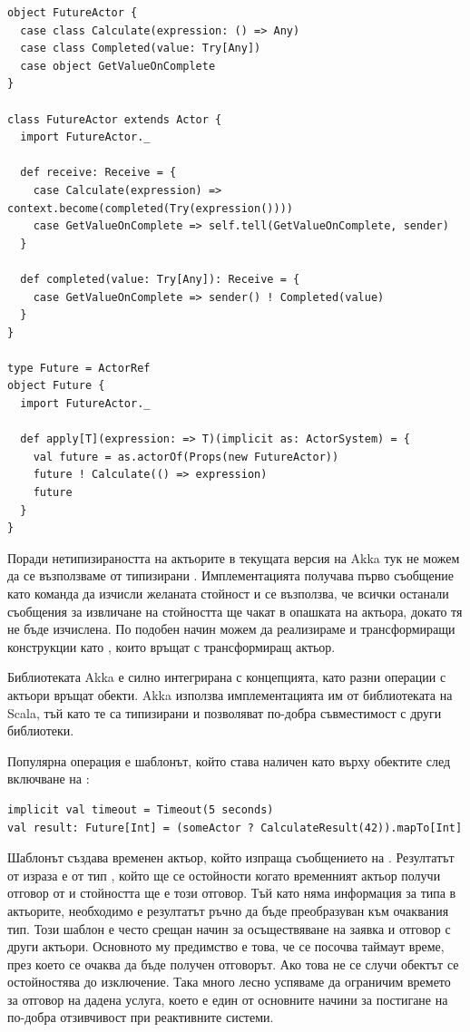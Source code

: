 \begin{lstlisting}
object FutureActor {
  case class Calculate(expression: () => Any)
  case class Completed(value: Try[Any])
  case object GetValueOnComplete
}

class FutureActor extends Actor {
  import FutureActor._
  
  def receive: Receive = {
    case Calculate(expression) => context.become(completed(Try(expression())))
    case GetValueOnComplete => self.tell(GetValueOnComplete, sender)
  }
  
  def completed(value: Try[Any]): Receive = {
    case GetValueOnComplete => sender() ! Completed(value)
  }
}

type Future = ActorRef
object Future {
  import FutureActor._
  
  def apply[T](expression: => T)(implicit as: ActorSystem) = {
    val future = as.actorOf(Props(new FutureActor))
    future ! Calculate(() => expression)
    future
  }
}
\end{lstlisting}

Поради нетипизираността на актьорите в текущата версия на Akka тук не можем да се възползваме от типизирани . Имплементацията получава първо съобщение като команда да изчисли желаната стойност и се възползва, че всички останали съобщения за извличане на стойността ще чакат в опашката на актьора, докато тя не бъде изчислена. По подобен начин можем да реализираме и трансформиращи конструкции като , които връщат  с трансформиращ актьор.

Библиотеката Akka е силно интегрирана с  концепцията, като разни операции с актьори връщат  обекти. Akka използва имплементацията им от библиотеката на Scala, тъй като те са типизирани и позволяват по-добра съвместимост с други библиотеки.

Популярна операция е  шаблонът, който става наличен като  върху  обектите след включване на :

\begin{lstlisting}
implicit val timeout = Timeout(5 seconds)
val result: Future[Int] = (someActor ? CalculateResult(42)).mapTo[Int]
\end{lstlisting}

Шаблонът създава временен актьор, който изпраща съобщението  на . Резултатът от израза е от тип , който ще се остойности когато временният актьор получи отговор от  и стойността ще е този отговор. Тъй като няма информация за типа в актьорите, необходимо е резултатът ръчно да бъде преобразуван към очаквания тип. Този шаблон е често срещан начин за осъществяване на заявка и отговор с други актьори. Основното му предимство е това, че се посочва таймаут време, през което се очаква да бъде получен отговорът. Ако това не се случи  обектът се остойностява до  изключение. Така много лесно успяваме да ограничим времето за отговор на дадена услуга, което е един от основните начини за постигане на по-добра отзивчивост при реактивните системи.

